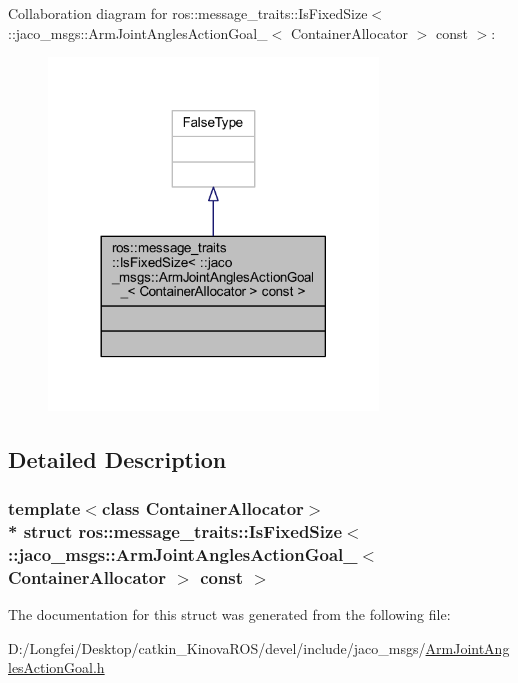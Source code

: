 Collaboration diagram for ros\+:\+:message\+\_\+traits\+:\+:Is\+Fixed\+Size$<$ \+:\+:jaco\+\_\+msgs\+:\+:Arm\+Joint\+Angles\+Action\+Goal\+\_\+$<$ Container\+Allocator $>$ const $>$\+:
\nopagebreak
\begin{figure}[H]
\begin{center}
\leavevmode
\includegraphics[width=248pt]{dc/d90/structros_1_1message__traits_1_1IsFixedSize_3_01_1_1jaco__msgs_1_1ArmJointAnglesActionGoal___3_067d36fc52494259afecb9d71fe89de37}
\end{center}
\end{figure}


\subsection{Detailed Description}
\subsubsection*{template$<$class Container\+Allocator$>$\\*
struct ros\+::message\+\_\+traits\+::\+Is\+Fixed\+Size$<$ \+::jaco\+\_\+msgs\+::\+Arm\+Joint\+Angles\+Action\+Goal\+\_\+$<$ Container\+Allocator $>$ const  $>$}



The documentation for this struct was generated from the following file\+:\begin{DoxyCompactItemize}
\item 
D\+:/\+Longfei/\+Desktop/catkin\+\_\+\+Kinova\+R\+O\+S/devel/include/jaco\+\_\+msgs/\hyperlink{ArmJointAnglesActionGoal_8h}{Arm\+Joint\+Angles\+Action\+Goal.\+h}\end{DoxyCompactItemize}
